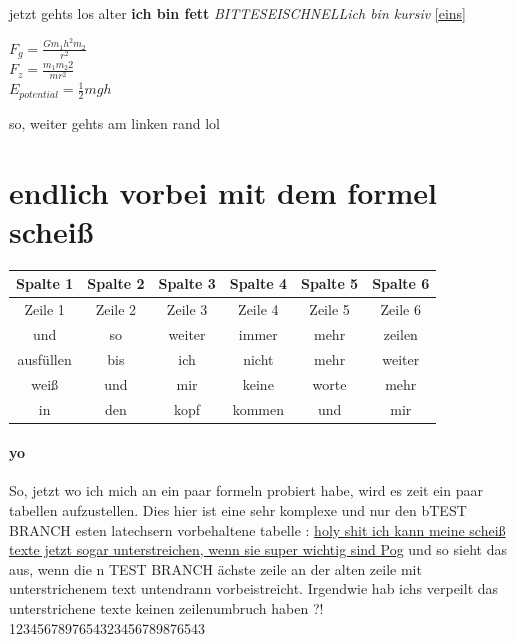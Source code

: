 \documentclass[a4paper]{scrartcl}
\begin{document}
				jetzt gehts los alter \textbf{ich bin fett}
				\emph{BITTESEISCHNELL}\textit{ich bin kursiv}
				\ref{eins}
				\linebreak[3]
				\\ \begin{center} \huge ${F}_{g}=\frac{G{m}_{1}h^2{m}_{2}}{{r}^{2}}$
				\linebreak[5]
				\\ {\color{red}${F}_{z}=\frac{{m}_{1}{m}_{2}{2}}{{}{m r}^{2}}$}
				\linebreak[5]
				\\$E_{potential}=\frac{{1}}{2}mgh$
				\linebreak[10]

				\end{center}

			so, weiter gehts am linken rand lol

		\section{endlich vorbei mit dem formel scheiß}
		\begin{tabular}{||c||c||c||c||c||c|}

			\hline
			Spalte 1  & Spalte 2 & Spalte 3 & Spalte 4 & Spalte 5 & Spalte 6 \\
			\hline
			Zeile 1  & Zeile 2  & Zeile 3  & Zeile 4 & Zeile 5 & Zeile 6 \\
			\hline
			und  & so  & weiter  & immer  & mehr  & zeilen  \\
			\hline
			ausfüllen & bis  & ich  & nicht  & mehr  & weiter \\
			\hline
			weiß  & und  & mir  & keine  & worte  & mehr \\
			\hline
			in  & den & kopf  & kommen  & und  & mir \\
			\hline
		\end{tabular}

		\paragraph{yo}
		So, jetzt wo ich mich an ein paar formeln probiert habe, wird es zeit ein paar tabellen aufzustellen. Dies hier ist eine sehr komplexe und nur den bTEST BRANCH esten latechsern vorbehaltene tabelle :
		\underline{holy shit ich kann meine scheiß texte jetzt sogar unterstreichen, wenn sie super wichtig sind Pog} und so sieht das aus, wenn die n TEST BRANCH ächste zeile an der alten zeile mit
		 unterstrichenem text untendrann vorbeistreicht. Irgendwie hab ichs verpeilt das unterstrichene texte keinen zeilenumbruch haben ?!  1234567897654323456789876543
\end{document}
